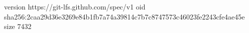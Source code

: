 version https://git-lfs.github.com/spec/v1
oid sha256:2caa29d36e3269e84b1fb7a74a39814c7b7c8747573c46023fe2243cfe4ae45e
size 7432
